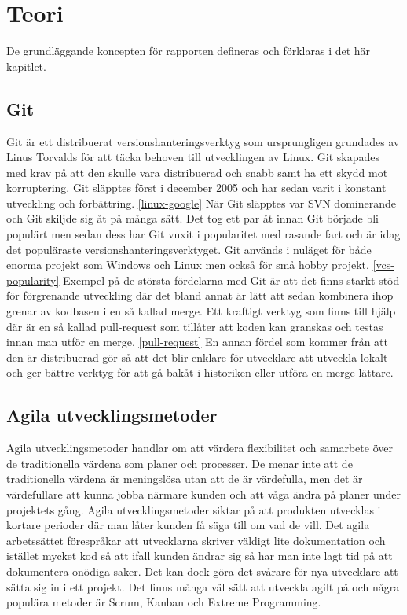 \section{Teori}
\label{sec:bjorn-theory}
De grundläggande koncepten för rapporten defineras och förklaras i det här kapitlet.

\subsection{Git}
Git är ett distribuerat versionshanteringsverktyg som ursprungligen grundades av Linus Torvalds för att täcka behoven till utvecklingen av Linux. Git skapades med krav på att den skulle vara distribuerad och snabb samt ha ett skydd mot korruptering. Git släpptes först i december 2005 och har sedan varit i konstant utveckling och förbättring. \ref{linux-google} När Git släpptes var SVN dominerande och Git skiljde sig åt på många sätt. Det tog ett par åt innan Git började bli populärt men sedan dess har Git vuxit i popularitet med rasande fart och är idag det populäraste versionshanteringsverktyget. Git används i nuläget för både enorma projekt som Windows och Linux men också för små hobby projekt. \ref{vcs-popularity}
Exempel på de största fördelarna med Git är att det finns starkt stöd för förgrenande utveckling där det bland annat är lätt att sedan kombinera ihop grenar av kodbasen i en så kallad merge. Ett kraftigt verktyg som finns till hjälp där är en så kallad pull-request som tillåter att koden kan granskas och testas innan man utför en merge. \ref{pull-request} En annan fördel som kommer från att den är distribuerad gör så att det blir enklare för utvecklare att utveckla lokalt och ger bättre verktyg för att gå bakåt i historiken eller utföra en merge lättare.

\subsection{Agila utvecklingsmetoder}
Agila utvecklingsmetoder handlar om att värdera flexibilitet och samarbete över de traditionella värdena som planer och processer. De menar inte att de traditionella värdena är meningslösa utan att de är värdefulla, men det är värdefullare att kunna jobba närmare kunden och att våga ändra på planer under projektets gång. Agila utvecklingsmetoder siktar på att produkten utvecklas i kortare perioder där man låter kunden få säga till om vad de vill. Det agila arbetssättet förespråkar att utvecklarna skriver väldigt lite dokumentation och istället mycket kod så att ifall kunden ändrar sig så har man inte lagt tid på att dokumentera onödiga saker. Det kan dock göra det svårare för nya utvecklare att sätta sig in i ett projekt.
Det finns många väl sätt att utveckla agilt på och några populära metoder är Scrum, Kanban och Extreme Programming.